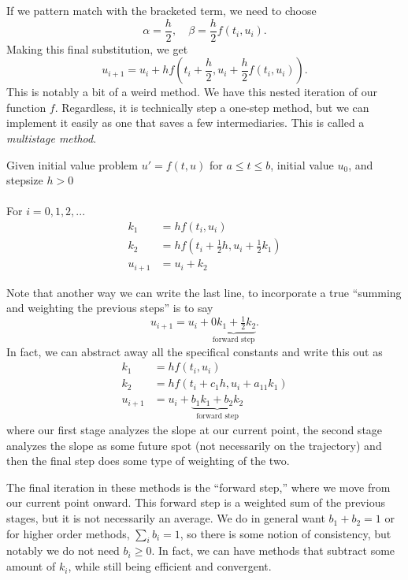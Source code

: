 \documentclass[11pt]{article}
\begin{document}
If we pattern match with the bracketed term, we need to choose $$\alpha = \frac{h}{2}, \quad \beta = \frac{h}{2}f(t_i, u_i).$$
Making this final substitution, we get $$u_{i+1} = u_i + hf\left(t_i + \frac{h}{2}, u_i + \frac{h}{2}f(t_i, u_i)\right).$$
This is notably a bit of a weird method. We have this nested iteration of our function $f$. Regardless, it is technically step a one-step method, but we can implement it easily as one that saves a few intermediaries. This is called a \textit{multistage method}.
\begin{algo}
    Given initial value problem $u' = f(t,u)$ for $a \leq t \leq b$, initial value $u_0$, and stepsize $h > 0$\\ \\
    For $i = 0, 1, 2, ...$
   \begin{align*}
        k_1 &= hf(t_i, u_i)\\
        k_2 &= hf(t_i + \tfrac{1}{2}h, u_i + \tfrac{1}{2}k_1)\\
        u_{i+1} &= u_i +
       k_2
   \end{align*}
\end{algo}
Note that another way we can write the last line, to incorporate a true ``summing and weighting the previous steps'' is to say $$u_{i+1} = u_i + \underbrace{0k_1+\tfrac{1}{2}k_2}_{\text{forward step}}.$$
In fact, we can abstract away all the specifical constants and write this out as \begin{align*}
    k_1 &= hf(t_i, u_i)\\
    k_2 &= hf(t_i + c_1h, u_i + a_{11}k_1)\\
    u_{i+1} &= u_i + \underbrace{b_1k_1+b_2k_2}_{\text{forward step}}
\end{align*}
where our first stage analyzes the slope at our current point, the second stage analyzes the slope as some future spot (not necessarily on the trajectory) and then the final step does some type of weighting of the two.
\begin{remark}
    The final iteration in these methods is the ``forward step,'' where we move from our current point onward. This forward step is a weighted sum of the previous stages, but it is not necessarily an average. We do in general want $b_1 + b_2 = 1$ or for higher order methods, $\sum_i b_i = 1$, so there is some notion of consistency, but notably we do not need $b_i \geq 0$. In fact, we can have methods that subtract some amount of $k_i$, while still being efficient and convergent.  
\end{remark}
\end{document}
